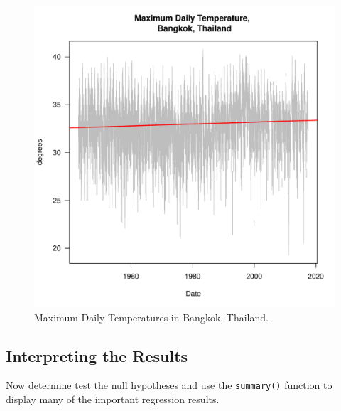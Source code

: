 \documentclass{article}\usepackage[]{graphicx}\usepackage[]{color}
\makeatletter
\def\maxwidth{ %
  \ifdim\Gin@nat@width>\linewidth
    \linewidth
  \else
    \Gin@nat@width
  \fi
}
\newenvironment{knitrout}{}{} %
\makeatother
\begin{document}
\begin{figure}
\caption{Maximum Daily Temperatures in Bangkok, Thailand.}
\label{fig:TMAX_trend}
\begin{knitrout}
\color{fgcolor}
\includegraphics[width=\maxwidth]{figure/TMAXTrendDaily-1} 

\end{knitrout}
\end{figure}

\subsection{Interpreting the Results}

Now determine test the null hypotheses and use the \texttt{summary()} function to display many of the important regression results.
\end{document}
